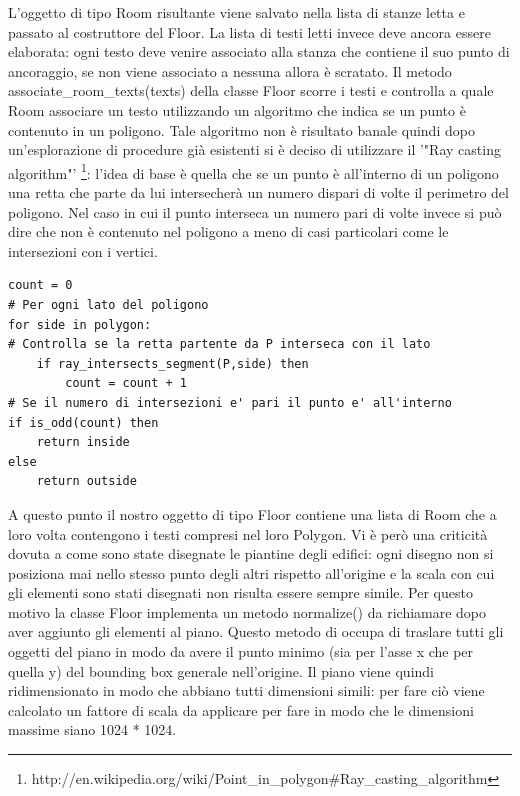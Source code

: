 \documentclass[12pt]{report}
\begin{document}
L'oggetto di tipo Room risultante viene salvato nella lista di stanze letta e passato al costruttore del Floor. La lista di testi letti invece deve ancora essere elaborata: ogni testo deve venire associato alla stanza che contiene il suo punto di ancoraggio, se non viene associato a nessuna allora è scratato.
Il metodo associate\_room\_texts(texts) della classe Floor scorre i testi e controlla a quale Room associare un testo utilizzando un algoritmo che indica se un punto è contenuto in un poligono. 
Tale algoritmo non è risultato banale quindi dopo un'esplorazione di procedure già esistenti si è deciso di utilizzare il '"Ray casting algorithm"' \footnote{http://en.wikipedia.org/wiki/Point\_in\_polygon\#Ray\_casting\_algorithm}: l'idea di base è quella che se un punto è all'interno di un poligono una retta che parte da lui intersecherà un numero dispari di volte il perimetro del poligono. Nel caso in cui il punto interseca un numero pari di volte invece si può dire che non è contenuto nel poligono a meno di casi particolari come le intersezioni con i vertici.

\begin{lstlisting}[label=codice,caption=Ray casting algorithm in pseudocodice, frame=single]
count = 0
# Per ogni lato del poligono
for side in polygon:
# Controlla se la retta partente da P interseca con il lato
    if ray_intersects_segment(P,side) then
        count = count + 1
# Se il numero di intersezioni e' pari il punto e' all'interno
if is_odd(count) then    
    return inside
else
    return outside
\end{lstlisting}

A questo punto il nostro oggetto di tipo Floor contiene una lista di Room che a loro volta contengono i testi compresi nel loro Polygon. 
Vi è però una criticità dovuta a come sono state disegnate le piantine degli edifici: ogni disegno non si posiziona mai nello stesso punto degli altri rispetto all'origine e la scala con cui gli elementi sono stati disegnati non risulta essere sempre simile. 
Per questo motivo la classe Floor implementa un metodo normalize() da richiamare dopo aver aggiunto gli elementi al piano. 
Questo metodo di occupa di traslare tutti gli oggetti del piano in modo da avere il punto minimo (sia per l'asse x che per quella y) del bounding box generale nell'origine. 
Il piano viene quindi ridimensionato in modo che abbiano tutti dimensioni simili: per fare ciò viene calcolato un fattore di scala da applicare per fare in modo che le dimensioni massime siano 1024 * 1024.
\end{document}
